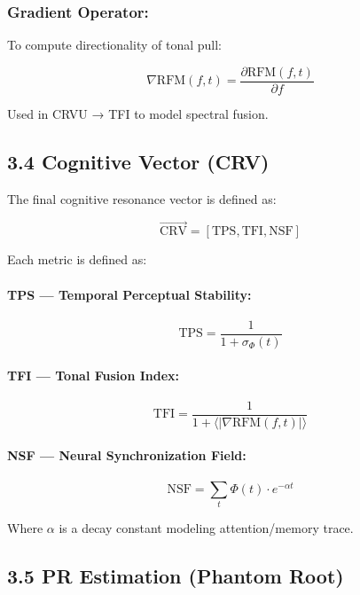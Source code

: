 \subsubsection*{Gradient Operator:}
To compute directionality of tonal pull:

\begin{equation}
\nabla \text{RFM}(f, t) = \frac{\partial \text{RFM}(f, t)}{\partial f}
\end{equation}

Used in CRVU → TFI to model spectral fusion.

\subsection*{3.4 Cognitive Vector (CRV)}

The final cognitive resonance vector is defined as:

\begin{equation}
\vec{\text{CRV}} = [\text{TPS}, \text{TFI}, \text{NSF}]
\end{equation}

Each metric is defined as:

\paragraph{TPS — Temporal Perceptual Stability:}
\begin{equation}
\text{TPS} = \frac{1}{1 + \sigma_\Phi(t)}
\end{equation}

\paragraph{TFI — Tonal Fusion Index:}
\begin{equation}
\text{TFI} = \frac{1}{1 + \langle |\nabla \text{RFM}(f, t)| \rangle}
\end{equation}

\paragraph{NSF — Neural Synchronization Field:}
\begin{equation}
\text{NSF} = \sum_t \Phi(t) \cdot e^{-\alpha t}
\end{equation}

Where $\alpha$ is a decay constant modeling attention/memory trace.

\subsection*{3.5 PR Estimation (Phantom Root)}

